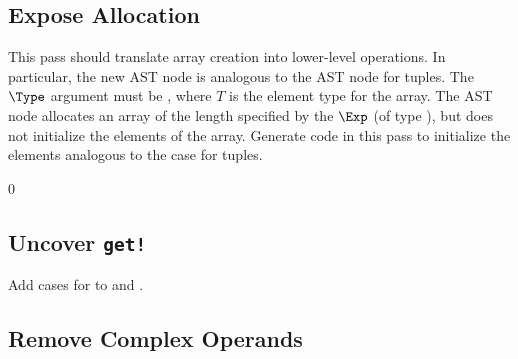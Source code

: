 \documentclass[7x10]{TimesAPriori_MIT}%
\def\racketEd{0}
\providecommand{\BookEdition}{1}
\let\edition\BookEdition
\numberwithin{theorem}{chapter}
\numberwithin{definition}{chapter}
\numberwithin{equation}{chapter}
\begin{document}


\subsection{Expose Allocation}


This pass should translate array creation into lower-level
operations. In particular, the new AST node \ALLOCARRAY{\Int}{\Type}
is analogous to the  AST node for tuples.  The $\Type$
argument must be , where $T$ is the element type for the
array. The  AST node allocates an array of the
length specified by the $\Exp$ (of type \INTTY), but does not
initialize the elements of the array. Generate code in this pass to
initialize the elements analogous to the case for tuples.


{\if\edition\racketEd
\subsection{Uncover \texttt{get!}}
\label{sec:uncover-get-bang-vecof}

Add cases for  to  and
.

\fi}

\subsection{Remove Complex Operands}
\end{document}
